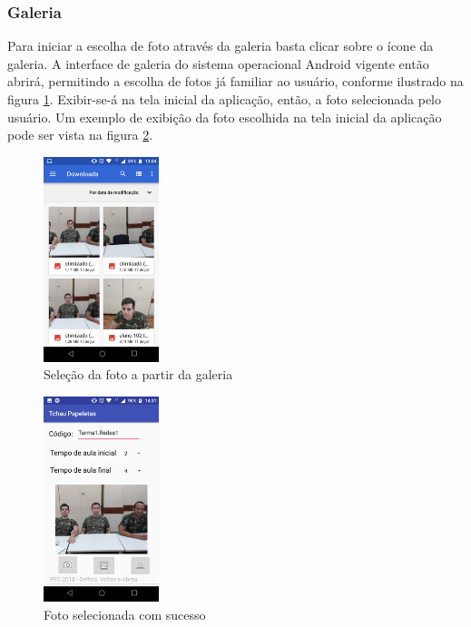 \subsubsection{Galeria}
Para iniciar a escolha de foto através da galeria basta clicar sobre o ícone da galeria. A interface de galeria do sistema operacional Android vigente então abrirá, permitindo a escolha de fotos já familiar ao usuário, conforme ilustrado na figura \ref{fig:figura71}. Exibir-se-á na tela inicial da aplicação, então, a foto selecionada pelo usuário. Um exemplo de exibição da foto escolhida na tela inicial da aplicação pode ser vista na figura \ref{fig:figura81}. 

\begin{figure}[!ht]
	\centering
\includegraphics[width=0.3\textwidth]{img/Galeria.png}  
	\caption{Seleção da foto a partir da galeria}
	\label{fig:figura71}
\end{figure}

\begin{figure}[!ht]
	\centering
\includegraphics[width=0.3\textwidth]{img/foto_selecionada_com_sucesso.png}  
	\caption{Foto selecionada com sucesso}
	\label{fig:figura81}
\end{figure}

